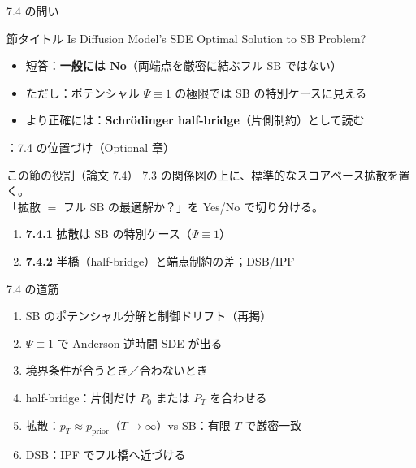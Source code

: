 

\asmain
\begin{frame}{7.4 の問い}
    \begin{block}{節タイトル}
        Is Diffusion Model's SDE Optimal Solution to SB Problem?
    \end{block}
    \begin{itemize}
        \item 短答：\textbf{一般には No}（両端点を厳密に結ぶフル SB ではない）
        \item ただし：ポテンシャル $\Psi\equiv 1$ の極限では SB の特別ケースに見える
        \item より正確には：\textbf{Schrödinger half-bridge}（片側制約）として読む
    \end{itemize}
\end{frame}
\assuppl
\begin{frame}{\supplmark：7.4 の位置づけ（Optional 章）}
    \begin{block}{この節の役割（論文 7.4）}
        7.3 の関係図の上に、標準的なスコアベース拡散を置く。\\
        「拡散 $=$ フル SB の最適解か？」を Yes/No で切り分ける。
    \end{block}
    \begin{enumerate}
        \item \textbf{7.4.1} 拡散は SB の特別ケース（$\Psi\equiv 1$）
        \item \textbf{7.4.2} 半橋（half-bridge）と端点制約の差；DSB/IPF
    \end{enumerate}
\end{frame}
\asmain
\begin{frame}{7.4 の道筋}
    \begin{enumerate}
        \item SB のポテンシャル分解と制御ドリフト（再掲）
        \item $\Psi\equiv 1$ で Anderson 逆時間 SDE が出る
        \item 境界条件が合うとき／合わないとき
        \item half-bridge：片側だけ $P_0$ または $P_T$ を合わせる
        \item 拡散：$p_T\approx p_{\mathrm{prior}}$（$T\to\infty$）vs SB：有限 $T$ で厳密一致
        \item DSB：IPF でフル橋へ近づける
    \end{enumerate}
\end{frame}

